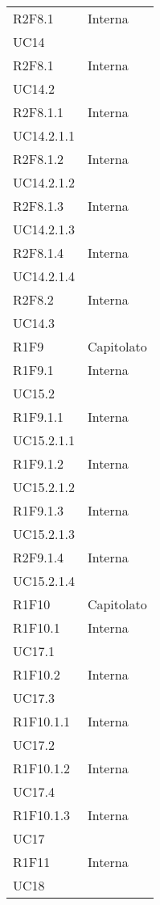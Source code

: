 \begin{longtable}{|C{6.5cm}|C{6.5cm}|}
	R2F8.1 & \centering Interna \\ UC14 \tabularnewline

	R2F8.1 & \centering Interna \\ UC14.2 \tabularnewline

	R2F8.1.1 & \centering Interna \\ UC14.2.1.1 \tabularnewline

	R2F8.1.2 & \centering Interna \\ UC14.2.1.2 \tabularnewline

	R2F8.1.3 & \centering Interna \\ UC14.2.1.3 \tabularnewline

	R2F8.1.4 & \centering Interna \\ UC14.2.1.4 \tabularnewline

	R2F8.2 & \centering Interna \\ UC14.3 \tabularnewline

	R1F9 &  Capitolato \\

	R1F9.1 & \centering Interna \\ UC15.2 \tabularnewline

	R1F9.1.1 & \centering Interna \\ UC15.2.1.1 \tabularnewline

	R1F9.1.2 & \centering Interna \\ UC15.2.1.2 \tabularnewline

	R1F9.1.3 & \centering Interna \\ UC15.2.1.3 \tabularnewline

	R2F9.1.4 & \centering Interna \\ UC15.2.1.4 \tabularnewline

	R1F10 & Capitolato \\

	R1F10.1 &  \centering Interna \\ UC17.1 \tabularnewline

	R1F10.2 & \centering Interna \\ UC17.3 \tabularnewline

	R1F10.1.1 &  \centering Interna \\ UC17.2 \tabularnewline

	R1F10.1.2 &  \centering Interna \\ UC17.4 \tabularnewline

	R1F10.1.3 &  \centering Interna \\ UC17 \tabularnewline

	R1F11 & \centering Interna \\ UC18 \tabularnewline


\end{longtable}
